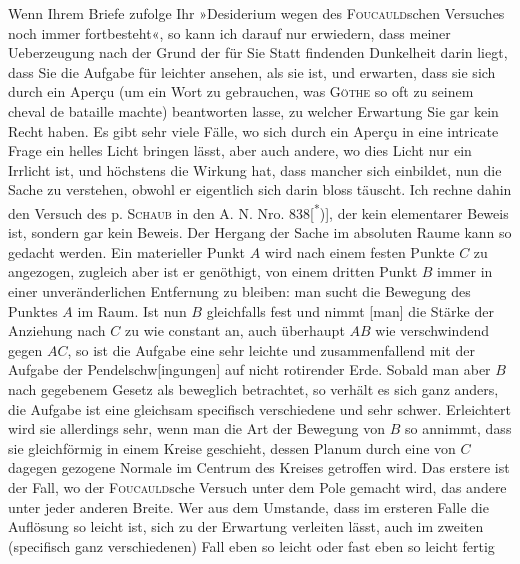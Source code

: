 Wenn Ihrem Briefe zufolge Ihr »Desiderium wegen des \textsc{Foucauld}schen
Versuches noch immer fortbesteht«, so kann ich darauf nur erwiedern, dass
meiner Ueberzeugung nach der Grund der für Sie Statt findenden Dunkelheit
darin liegt, dass Sie die Aufgabe für leichter ansehen, als sie ist, und erwarten,
dass sie sich durch ein Aperçu (um ein Wort zu gebrauchen, was
\textsc{Göthe} so oft zu seinem cheval de bataille machte) beantworten lasse, zu
welcher Erwartung Sie gar kein Recht haben. Es gibt sehr viele Fälle, wo
sich durch ein Aperçu in eine intricate Frage ein helles Licht bringen lässt,
aber auch andere, wo dies Licht nur ein Irrlicht ist, und höchstens die Wirkung
hat, dass mancher sich einbildet, nun die Sache zu verstehen, obwohl
er eigentlich sich darin bloss täuscht. Ich rechne dahin den Versuch des
p. \textsc{Schaub} in den A. N. Nro. 838[\textsuperscript{*})]\begingroup\renewcommand{\thefootnote}{}\endgroup, der kein elementarer Beweis ist, sondern
gar kein Beweis. Der Hergang der Sache im absoluten Raume kann so gedacht
werden. Ein materieller Punkt \(A\) wird nach einem festen Punkte \(C\) zu
angezogen, zugleich aber ist er genöthigt, von einem dritten Punkt \(B\) immer
in einer unveränderlichen Entfernung zu bleiben: man sucht die Bewegung
des Punktes \(A\) im Raum. Ist nun \(B\) gleichfalls fest und nimmt [man] die
Stärke der Anziehung nach \(C\) zu wie constant an, auch überhaupt \(AB\) wie
verschwindend gegen \(AC\), so ist die Aufgabe eine sehr leichte und zusammenfallend
mit der Aufgabe der Pendelschw[ingungen] auf nicht rotirender Erde.
Sobald man aber \(B\) nach gegebenem Gesetz als beweglich betrachtet, so
verhält es sich ganz anders, die Aufgabe ist eine gleichsam specifisch verschiedene
und sehr schwer. Erleichtert wird sie allerdings sehr, wenn man
die Art der Bewegung von \(B\) so annimmt, dass sie gleichförmig in einem
Kreise geschieht, dessen Planum durch eine von \(C\) dagegen gezogene Normale
im Centrum des Kreises getroffen wird. Das erstere ist der Fall, wo der
\clearpage{}
\noindent \textsc{Foucauld}sche Versuch unter dem Pole gemacht wird, das andere unter jeder
anderen Breite. Wer aus dem Umstande, dass im ersteren Falle die Auflösung
so leicht ist, sich zu der Erwartung verleiten lässt, auch im zweiten
(specifisch ganz verschiedenen) Fall eben so leicht oder fast eben so leicht fertig
